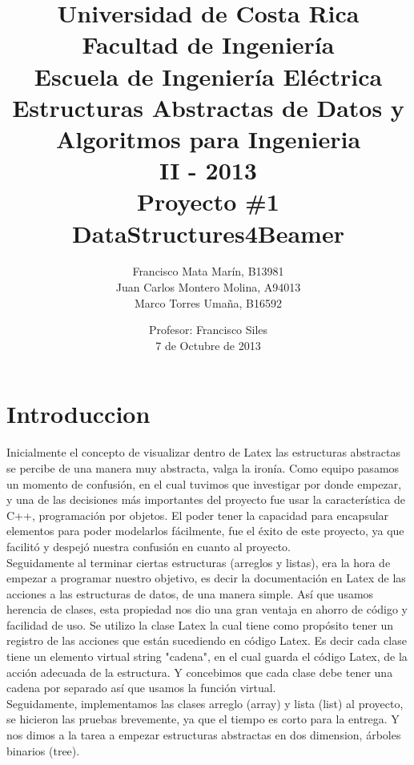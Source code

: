 \documentclass[12pt,letterpaper]{article}     %
\author{
Francisco Mata Marín, B13981 \\
Juan Carlos Montero Molina, A94013 \\
Marco Torres Umaña, B16592   \vspace {10mm}}
\title{{Universidad de Costa Rica \\ 
		Facultad de Ingeniería \\
		Escuela de Ingeniería Eléctrica \\
		Estructuras Abstractas de Datos y Algoritmos para Ingenieria \\
		II - 2013\\  		 
		\vspace* {50mm}			
		 Proyecto \#1 \\ DataStructures4Beamer } \vspace* {50mm}}
\date{Profesor: Francisco Siles\\7 de Octubre de 2013}
\begin{document}
	\maketitle							%
	\newpage






 

\section{Introduccion}

Inicialmente el concepto de visualizar dentro de Latex las estructuras abstractas se percibe de una manera muy abstracta, valga la ironía. Como equipo pasamos un momento de confusión, en el cual tuvimos que investigar por donde empezar, y una de las decisiones más importantes del proyecto fue usar la característica de C++, programación por objetos. El poder tener la capacidad para encapsular elementos para poder modelarlos fácilmente, fue el éxito de este proyecto, ya que facilitó y despejó nuestra confusión en cuanto al proyecto.\\

Seguidamente al terminar ciertas estructuras (arreglos y listas), era la hora de empezar a programar nuestro objetivo, es decir la documentación en Latex de las acciones a las estructuras de datos, de una manera simple. Así que usamos herencia de clases, esta propiedad nos dio una gran ventaja en ahorro de código y facilidad de uso. Se utilizo la clase Latex la cual tiene como propósito tener un registro de las acciones que están sucediendo en código Latex. Es decir cada clase tiene un elemento virtual string "cadena", en el cual guarda el código Latex, de la acción adecuada de la estructura. Y concebimos que cada clase debe tener una cadena por separado así que usamos la función virtual.\\

Seguidamente, implementamos las clases arreglo (array)  y lista (list) al proyecto, se hicieron las pruebas brevemente, ya que el tiempo es corto para la entrega. Y nos dimos a la tarea a empezar estructuras abstractas en dos dimension, árboles binarios (tree).\\
\end{document}
